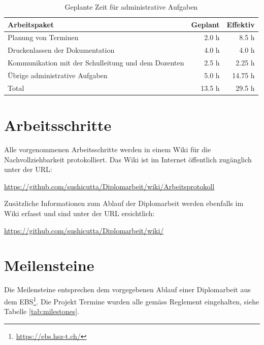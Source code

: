   \begin{table}[htb]
    \sffamily 
    \begin{center}
      \begin{tabular}{p{9cm}rr}
        \toprule
        \textbf{Arbeitspaket} & \textbf{Geplant} & \textbf{Effektiv} \\
        \midrule
        Planung von Terminen &
        2.0 h &
        8.5 h\\
        Druckenlassen der Dokumentation &
        4.0 h &
        4.0 h\\
        Kommunikation mit der Schulleitung und dem Dozenten &
        2.5 h &
        2.25 h\\
        Übrige administrative Aufgaben &
        5.0 h &
        14.75 h\\
        \bottomrule
        Total &
        13.5 h &
        29.5 h\\
        \bottomrule
      \end{tabular}
      \caption{Geplante Zeit für administrative Aufgaben}
      \label{tab:administrationPlaning}
    \end{center}
  \end{table}
  
  \section{Arbeitsschritte}
  
  Alle vorgenommenen Arbeitsschritte werden in einem Wiki für die
  Nachvollziehbarkeit protokolliert. Das Wiki ist im Internet öffentlich
  zugänglich unter der \ac{URL}:
  \newline
  
  \url{https://github.com/sushicutta/Diplomarbeit/wiki/Arbeitsprotokoll}
  \newline
  
  \noindent
  Zusätzliche Informationen zum Ablauf der Diplomarbeit werden ebenfalls im Wiki
  erfasst und sind unter der \ac{URL} ersichtlich:
  \newline
  
  \url{https://github.com/sushicutta/Diplomarbeit/wiki/}
  
  \section{Meilensteine}
  
  Die Meilensteine entsprechen dem vorgegebenen Ablauf einer Diplomarbeit aus
  dem \ac{EBS}\footnote{\url{https://ebs.hsz-t.ch/}}. Die Projekt Termine wurden
  alle gemäss Reglement eingehalten, siehe Tabelle \ref{tab:milestones}.
  \newline
  
